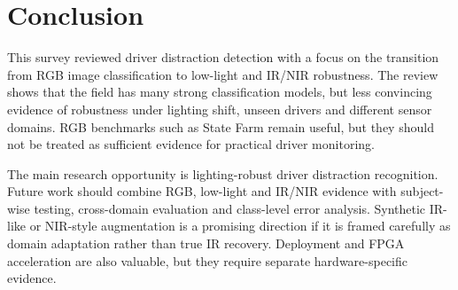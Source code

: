 \documentclass[11pt,a4paper]{article}
\let\oldsection\section
\renewcommand{\section}{\FloatBarrier\Needspace{9\baselineskip}\oldsection}
\begin{document}
\section{Conclusion}

This survey reviewed driver distraction detection with a focus on the transition from RGB image classification to low-light and IR/NIR robustness. The review shows that the field has many strong classification models, but less convincing evidence of robustness under lighting shift, unseen drivers and different sensor domains. RGB benchmarks such as State Farm remain useful, but they should not be treated as sufficient evidence for practical driver monitoring.

The main research opportunity is lighting-robust driver distraction recognition. Future work should combine RGB, low-light and IR/NIR evidence with subject-wise testing, cross-domain evaluation and class-level error analysis. Synthetic IR-like or NIR-style augmentation is a promising direction if it is framed carefully as domain adaptation rather than true IR recovery. Deployment and FPGA acceleration are also valuable, but they require separate hardware-specific evidence.

\nocite{young2003,dong2011,sahayadhas2012,sikander2019,ramzan2019,kaplan2015,doshi2009,vicente2015,horgan2021,dontoh2025modalities,dontoh2025visual,erso2022distraction,barr2005,saad2020dataset,dmdwebsite,kidu2024rgbdt,majdi2020drivenet,tan2020lrcn,streiffer2017dar,du2018multimodal,driverMHG2020,syndd2022,roma2022,hossain2022,gumaei2020}

\clearpage
\printbibliography[title={References}]
\end{document}
